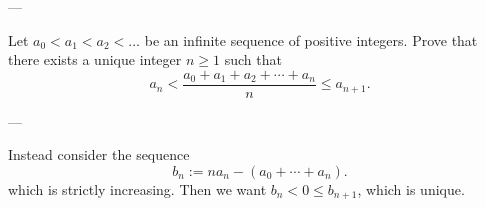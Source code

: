 
---

Let $a_0<a_1<a_2<\ldots$ be an infinite sequence of positive integers. Prove that there exists a unique integer $n\ge1$ such that
\[a_n<\frac{a_0+a_1+a_2+\cdots+a_n}n\le a_{n+1}.\]

---

Instead consider the sequence \[b_n:=na_n-(a_0+\cdots+a_n).\]
which is strictly increasing. Then we want $b_n<0\le b_{n+1}$, which is unique.

